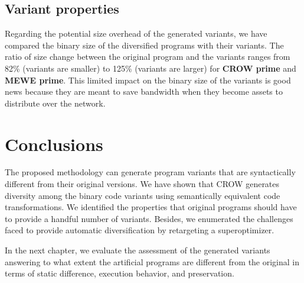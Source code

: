 \subsection{Variant properties}

Regarding the potential size overhead of the generated variants, we have compared the \wasm binary size of the diversified programs with their variants. The ratio of size change between the original program and the variants ranges from 82\% (variants are smaller) to 125\% (variants are larger) for \textbf{CROW prime} and \textbf{MEWE prime}. This limited impact on the binary size of the variants is good news because they are meant to save bandwidth when they become assets to distribute over the network.

\pagebreak
\section{Conclusions}

The proposed methodology can generate program variants that are syntactically different from their original versions. We have shown that CROW generates diversity among the binary code variants using semantically equivalent code transformations. We identified the properties that original programs should have to provide a handful number of variants. Besides, we enumerated the challenges faced to provide automatic diversification by retargeting a superoptimizer.

In the next chapter, we evaluate the assessment of the generated variants answering to what extent the artificial programs are different from the original in terms of static difference, execution behavior, and preservation.

\let\cleardoublepage\clearpage